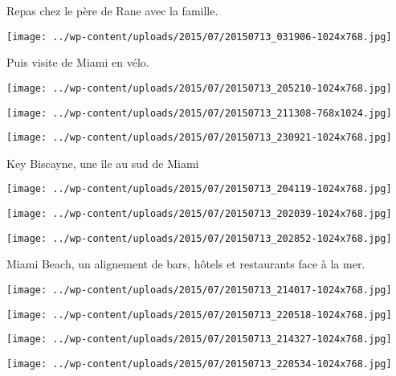  Repas chez le père de Rane avec la famille. \newline
 \newline
\centerline{\texttt{[image: ../wp-content/uploads/2015/07/20150713\_031906-1024x768.jpg]} } 
 \newline
 Puis visite de Miami en vélo. \newline
 \newline
\centerline{\texttt{[image: ../wp-content/uploads/2015/07/20150713\_205210-1024x768.jpg]} } 
 \newline
 \newline
\centerline{\texttt{[image: ../wp-content/uploads/2015/07/20150713\_211308-768x1024.jpg]} } 
 \newline
 \newline
\centerline{\texttt{[image: ../wp-content/uploads/2015/07/20150713\_230921-1024x768.jpg]} } 
 \newline
 Key Biscayne, une île au sud de Miami \newline
 \newline
\centerline{\texttt{[image: ../wp-content/uploads/2015/07/20150713\_204119-1024x768.jpg]} } 
 \newline
 \newline
\centerline{\texttt{[image: ../wp-content/uploads/2015/07/20150713\_202039-1024x768.jpg]} } 
 \newline
 \newline
\centerline{\texttt{[image: ../wp-content/uploads/2015/07/20150713\_202852-1024x768.jpg]} } 
 \newline
 Miami Beach, un alignement de bars, hôtels et restaurants face à la mer. \newline
 \newline
\centerline{\texttt{[image: ../wp-content/uploads/2015/07/20150713\_214017-1024x768.jpg]} } 
 \newline
 \newline
\centerline{\texttt{[image: ../wp-content/uploads/2015/07/20150713\_220518-1024x768.jpg]} } 
 \newline
 \newline
\centerline{\texttt{[image: ../wp-content/uploads/2015/07/20150713\_214327-1024x768.jpg]} } 
 \newline
 \newline
\centerline{\texttt{[image: ../wp-content/uploads/2015/07/20150713\_220534-1024x768.jpg]} } 
 \newline

\newpage
 
